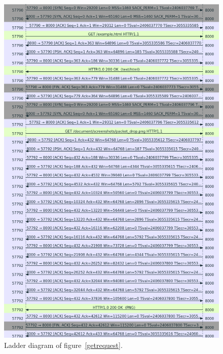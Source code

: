 \documentclass[titlepage]{article}
\begin{document}
\begin{figure}[H]
  \centering
  \includegraphics[width=\textwidth]{screenshots/website_get_ladder.png}
  \caption{%
    Ladder diagram of figure~\ref{getrequest}.
  }\label{getrequestladder}
\end{figure}
\end{document}
